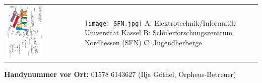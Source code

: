\vspace{1cm}

\begin{tabularx}{\textwidth}{XX}
\includegraphics[width=0.49\textwidth]{2013-09_Plan_WA.jpeg}
&
\texttt{[image: SFN.jpg]}\newline
A: Elektrotechnik/Informatik Universität Kassel\newline
B: Schülerforschungszentrum Nordhessen (SFN)\newline
C: Jugendherberge
\end{tabularx}

\textbf{Handynummer vor Ort:} 01578 6143627 (Ilja Göthel, Orpheus-Betreuer)

\cleardoublepage
